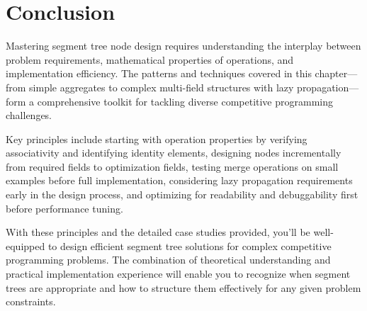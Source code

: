 \section{Conclusion}

Mastering segment tree node design requires understanding the interplay between problem requirements, mathematical properties of operations, and implementation efficiency. The patterns and techniques covered in this chapter—from simple aggregates to complex multi-field structures with lazy propagation—form a comprehensive toolkit for tackling diverse competitive programming challenges.


Key principles include starting with operation properties by verifying associativity and identifying identity elements, designing nodes incrementally from required fields to optimization fields, testing merge operations on small examples before full implementation, considering lazy propagation requirements early in the design process, and optimizing for readability and debuggability first before performance tuning.

With these principles and the detailed case studies provided, you'll be well-equipped to design efficient segment tree solutions for complex competitive programming problems. The combination of theoretical understanding and practical implementation experience will enable you to recognize when segment trees are appropriate and how to structure them effectively for any given problem constraints.